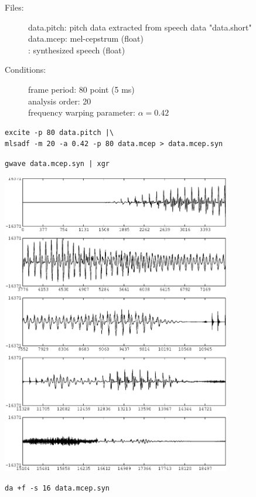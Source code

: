 \documentclass[a4paper]{article}
\begin{document}
\begin{description}
\item[Files:]
  data.pitch: pitch data extracted from speech data "data.short"\\
  data.mcep: mel-cepstrum (float) \\
  : 
  synthesized speech (float)
\item[Conditions:]
  frame period: 80 point (5 ms)\\
  analysis order: 20\\
  frequency warping parameter: $\alpha = 0.42$
\end{description}

\begin{verbatim}
excite -p 80 data.pitch |\
mlsadf -m 20 -a 0.42 -p 80 data.mcep > data.mcep.syn
\end{verbatim}

\begin{verbatim}
gwave data.mcep.syn | xgr
\end{verbatim}

\includegraphics[width=10cm]{data.mcep.syn.gwave.eps}

\begin{verbatim}
da +f -s 16 data.mcep.syn
\end{verbatim}
\end{document}
